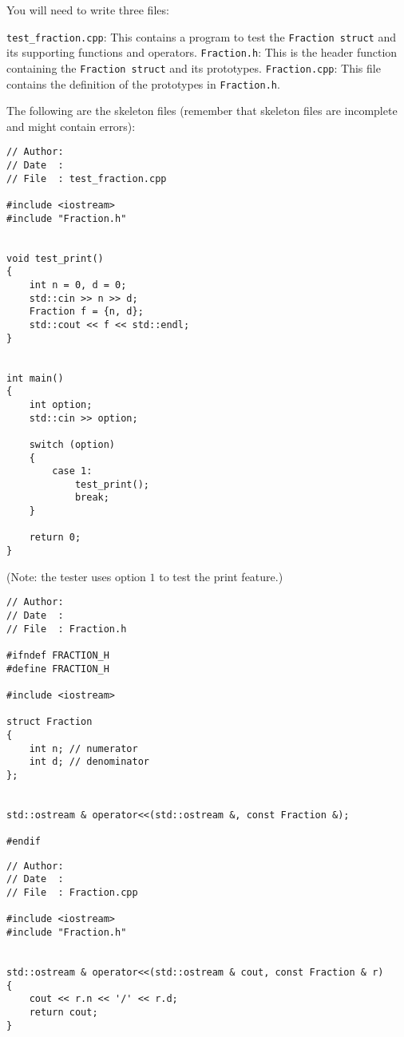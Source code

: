 You will need to write three files:
\begin{itemize}
  \li \verb!test_fraction.cpp!: This contains a program to test the
      \verb!Fraction struct! and its supporting functions and operators.
  \li \verb!Fraction.h!: This is the header function containing the
      \verb!Fraction struct! and its prototypes.
  \li \verb!Fraction.cpp!: This file contains the definition of the prototypes
      in \verb!Fraction.h!.
\end{itemize}

The following are the skeleton files (remember that skeleton files
are incomplete and might contain errors):
{\small
\begin{Verbatim}[frame=single]
// Author: 
// Date  : 
// File  : test_fraction.cpp

#include <iostream>
#include "Fraction.h"


void test_print()
{
    int n = 0, d = 0;
    std::cin >> n >> d;
    Fraction f = {n, d};
    std::cout << f << std::endl;
}


int main()
{
    int option;
    std::cin >> option;
 
    switch (option)
    {
        case 1:
            test_print();
            break;
    }

    return 0; 
}
\end{Verbatim}
}

(Note: the tester uses option $1$ to test the print feature.)

\begin{Verbatim}[frame=single]
// Author: 
// Date  : 
// File  : Fraction.h

#ifndef FRACTION_H
#define FRACTION_H

#include <iostream>

struct Fraction
{
    int n; // numerator
    int d; // denominator
};


std::ostream & operator<<(std::ostream &, const Fraction &);

#endif
\end{Verbatim}

\begin{Verbatim}[frame=single]
// Author: 
// Date  : 
// File  : Fraction.cpp

#include <iostream>
#include "Fraction.h"


std::ostream & operator<<(std::ostream & cout, const Fraction & r)
{
    cout << r.n << '/' << r.d;
    return cout;
}
\end{Verbatim}

